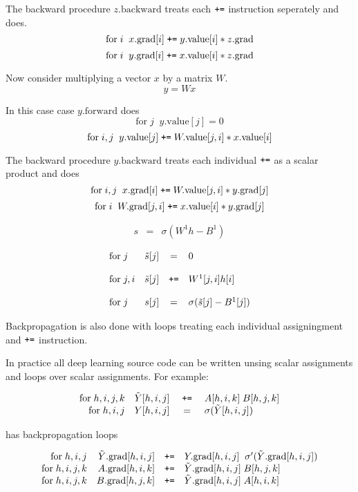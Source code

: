 {\vfill
The backward procedure $z.\mathrm{backward}$ treats each $\mbox{\tt +=}$ instruction seperately and does.
$$\mathrm{for}\;i\;\;x.\mathrm{grad}[i] \;\mbox{\tt +=}\;y.\mathrm{value}[i]*z.\mathrm{grad}$$
$$\mathrm{for}\;i\;\;y.\mathrm{grad}[i] \;\mbox{\tt +=}\;x.\mathrm{value}[i]*z.\mathrm{grad}$$

Now consider multiplying a vector $x$ by a matrix $W$.
$$y = Wx$$

\vfill
In this case case $y.\mathrm{forward}$ does
$$\mathrm{for}\;j\;\;y.\mathrm{value}[j] = 0$$
$$\mathrm{for}\;i,j\;\;y.\mathrm{value}[j] \;\mbox{\tt +=}\;W.\mathrm{value}[j,i]*x.\mathrm{value}[i]$$

\vfill
The backward procedure $y.\mathrm{backward}$ treats each individual $\mbox{\tt +=}$ as a scalar product and does
$$\mathrm{for}\;i,j\;\;x.\mathrm{grad}[i] \;\mbox{\tt +=}\;W.\mathrm{value}[j,i]*y.\mathrm{grad}[j]$$
$$\mathrm{for}\;i\;\;W.\mathrm{grad}[j,i] \;\mbox{\tt +=}\;x.\mathrm{value}[i]*y.\mathrm{grad}[j]$$


\begin{eqnarray*}
   s & = & \sigma\left(W^1h - B^1 \right)
\end{eqnarray*}

\vfill
$$\begin{array}{lrcl}
\mathrm{for}\;j &  \tilde{s}[j] & = & 0 \\
\\
\mathrm{for}\;j,i &  \tilde{s}[j] & \mbox{\tt +=} &  W^1[j,i]h[i] \\
\\
\mathrm{for}\; j & s[j] & = & \sigma(\tilde{s}[j] - B^1[j])
\end{array}$$

\vfill
Backpropagation is also done with loops treating each individual assigningment and $\mbox{\tt +=}$ instruction.


In practice all deep learning source code can be written unsing scalar assignments and loops over scalar assignments.
For example:

$$\begin{array}{rrcl}
\mathrm{for}\; h,i,j,k & \tilde{Y}[h,i,j] & \;\mbox{\tt +=}\; & A[h,i,k]\;B[h,j,k] \\
\mathrm{for}\; h,i,j & Y[h,i,j] & = & \sigma(\tilde{Y}[h,i,j])
\end{array}$$

\vfill
has backpropagation loops

$$\begin{array}{rrcl}
\mathrm{for}\;h,i,j & \tilde{Y}.\mathrm{grad}[h,i,j] & \mbox{\tt +=} & Y.\mathrm{grad}[h,i,j]\;\;\sigma'(\tilde{Y}.\mathrm{grad}[h,i,j]) \\
\mathrm{for}\;h,i,j,k & A.\mathrm{grad}[h,i,k] & \mbox{\tt +=} & \tilde{Y}.\mathrm{grad}[h,i,j] \;B[h,j,k] \\
\mathrm{for}\;h,i,j,k & B.\mathrm{grad}[h,j,k] & \mbox{\tt +=} & \tilde{Y}.\mathrm{grad}[h,i,j]\;A[h,i,k]
\end{array}$$

}


